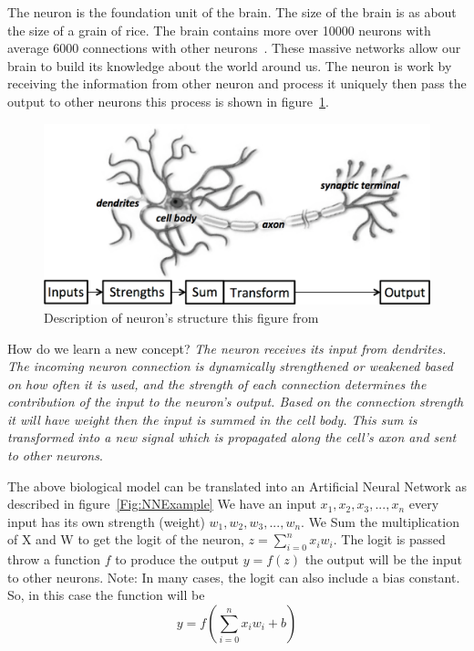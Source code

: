  The neuron is the foundation unit of the brain. The size of the brain is as about the size of a grain of rice. The brain contains more over 10000 neurons with average 6000 connections with other neurons~\cite{Restak_2001}.  These massive networks allow our brain to build its knowledge about the world around us. The neuron is work by receiving the information from other neuron and process it uniquely then pass the output to other neurons this process is shown in figure~\ref{Fig:Neuron_Structure}.%
 \begin{figure}[!t] \includegraphics[width=\linewidth]{./Figures/Ch_2_Background/neuron_structure.png}
  \caption{Description of neuron's structure this figure from~\cite{DLFundamentals}}
  \label{Fig:Neuron_Structure}
\end{figure}%
 How do we learn a new concept? \textit{The neuron receives its input from dendrites. The incoming neuron connection is dynamically strengthened or weakened based on how often it is used, and the strength of each connection determines the contribution of the input to the neuron's output. Based on the connection strength it will have weight then the input is summed in the cell body. This sum is transformed into a new signal which is propagated along the cell's axon and sent to other neurons\cite{DLFundamentals}}.

 The above biological model can be translated into an Artificial Neural Network as described in figure~\ref{Fig:NNExample} We have an input $x_1,x_2,x_3,...,x_n$ every input has its own strength (weight) $w_1,w_2,w_3,...,w_n$. We Sum the multiplication of X and W to get the logit of the neuron, $z =  \sum_{i=0}^{n} x_i w_i $. The logit is passed throw a function $f$ to produce the output $ y = f(z)$ the output will be the input to other neurons. Note: In many cases, the logit can also include a bias constant. So, in this case the function will be $$ y = f(\sum_{i=0}^{n} x_i w_i + b)$$
 
